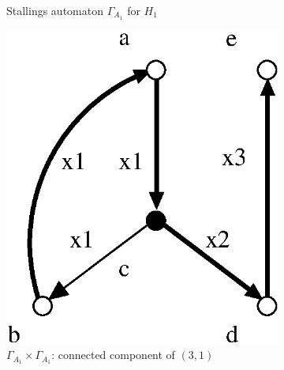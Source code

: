 \documentclass[a4paper,12pt]{article}
\newcommand{\G}{\Gamma }
\numberwithin{equation}{section}
\numberwithin{figure}{section}
\begin{document}
\begin{figure}
\begin{center}
\begin{subfigure}[b]{.25\columnwidth}
\caption{Stallings automaton $\G_{A_1}$ for $H_1$}
\label{fig:stall1}
\end{subfigure}
\hspace{5mm}
\begin{subfigure}[b]{.25\columnwidth}
\includegraphics[scale=.52]{GxG-1.eps}
\caption{$\G_{A_1}\times \G_{A_1}$: connected component of $(3,1)$}
\label{fig:GxG-1}
\end{subfigure}
\hspace{5mm}
\begin{subfigure}[b]{.25\columnwidth}

\end{subfigure}
\end{center}
\end{figure}
\end{document}
